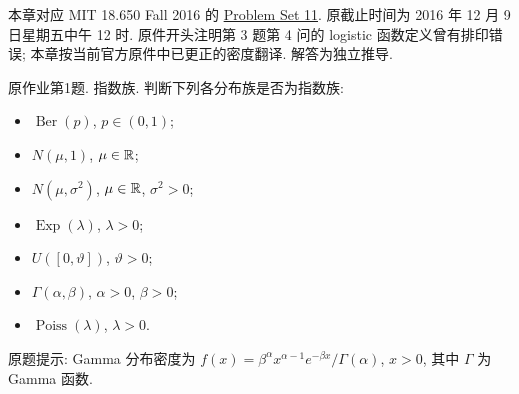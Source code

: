 \label{chap:ps11}
本章对应 MIT 18.650 Fall 2016 的 \href{https://ocw.mit.edu/courses/18-650-statistics-for-applications-fall-2016/resources/problem-set-11/}{Problem Set 11}. 原截止时间为 2016 年 12 月 9 日星期五中午 12 时. 原件开头注明第 3 题第 4 问的 logistic 函数定义曾有排印错误; 本章按当前官方原件中已更正的密度翻译. 解答为独立推导.

\begin{exercise}\label{ps11:p01}
原作业第1题. 指数族.
判断下列各分布族是否为指数族:
\begin{itemize}
\item $\operatorname{Ber}(p)$, $p\in(0,1)$;
\item $N(\mu,1)$, $\mu\in\mathbb R$;
\item $N(\mu,\sigma^2)$, $\mu\in\mathbb R$, $\sigma^2>0$;
\item $\operatorname{Exp}(\lambda)$, $\lambda>0$;
\item $U([0,\vartheta])$, $\vartheta>0$;
\item $\Gamma(\alpha,\beta)$, $\alpha>0$, $\beta>0$;
\item $\operatorname{Poiss}(\lambda)$, $\lambda>0$.
\end{itemize}
原题提示: Gamma 分布密度为 $f(x)=\beta^\alpha x^{\alpha-1}e^{-\beta x}/\Gamma(\alpha)$, $x>0$, 其中 $\Gamma$ 为 Gamma 函数.
\end{exercise}
